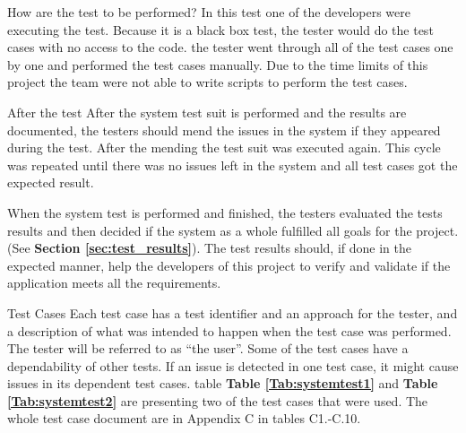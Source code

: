 How are the test to be performed? \newline
In this test one of the developers were executing the test. Because it is a black box test, the tester would do the test cases with no access to the code. the tester went through all of the test cases one by one and performed the test cases manually. Due to the time limits of this project the team were not able to write scripts to perform the test cases. \newline

After the test\newline
After the system test suit is performed and the results are documented, the testers should mend the issues in the system if they appeared during the test. After the mending the test suit was executed again. This cycle was repeated until there was no issues left in the system and all test cases got the expected result.\newline

When the system test is performed and finished, the testers evaluated the tests results and then decided if the system as a whole fulfilled all goals for the project.(See \textbf{Section \ref{sec:test_results}}). The test results should, if done in the expected manner, help the developers of this project to verify and validate if the application meets all the requirements.\newline

Test Cases \newline
Each test case has a test identifier and an approach for the tester, and a description of what was intended to happen when the test case was performed. The tester will be referred to as “the user”. Some of the test cases have a dependability of other tests. If an issue is detected in one test case, it might cause issues in its dependent test cases. table \textbf{Table \ref{Tab:systemtest1}} and \textbf{Table \ref{Tab:systemtest2}} are presenting two of the test cases that were used. The whole test case document are in Appendix C in tables C1.-C.10. 

